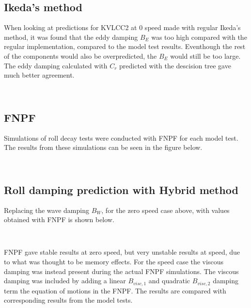     \subsection{Ikeda's method}\label{ikedas-method}

    When looking at predictions for KVLCC2 at 0 speed made with regular
Ikeda's method, it was found that the eddy damping \(B_E\) was too high
compared with the regular implementation, compared to the model test
results. Eventhough the rest of the components would also be
overpredicted, the \(B_E\) would still be too large. The eddy damping
calculated with \(C_r\) predicted with the descision tree gave much
better agreement.

    \begin{center}
    \end{center}
    { \hspace*{\fill} \\}
    
    \subsection{FNPF}\label{fnpf}

Simulations of roll decay tests were conducted with FNPF for each model
test. The results from these simulations can be seen in the figure
below.

    \begin{center}
    \end{center}
    { \hspace*{\fill} \\}
    
    \subsection{Roll damping prediction with Hybrid
method}\label{roll-damping-prediction-with-hybrid-method}
Replacing the wave damping $B_W$, for the zero speed case above, with values obtained with FNPF is shown below. 
    \begin{center}
    \end{center}
    { \hspace*{\fill} \\}
    
    FNPF gave stable results at zero speed, but very unstable results at
speed, due to what was thought to be memory effects. For the speed case
the viscous damping was instead present during the actual FNPF
simulations. The viscous damping was included by adding a linear
\(B_{visc,1}\) and quadratic \(B_{visc,2}\) damping term the equation of
motions in the FNPF. The results are compared with corresponding results
from the model tests.


